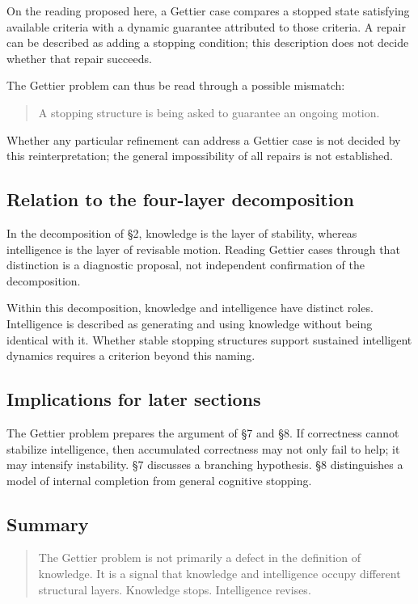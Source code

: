 On the reading proposed here, a Gettier case compares a stopped state satisfying available criteria with a dynamic guarantee attributed to those criteria. A repair can be described as adding a stopping condition; this description does not decide whether that repair succeeds.

The Gettier problem can thus be read through a possible mismatch:

\begin{quote}
A stopping structure is being asked to guarantee an ongoing motion.
\end{quote}

Whether any particular refinement can address a Gettier case is not decided by this reinterpretation; the general impossibility of all repairs is not established.

\subsection{Relation to the four-layer decomposition}

In the decomposition of \S{}2, knowledge is the layer of stability, whereas intelligence is the layer of revisable motion. Reading Gettier cases through that distinction is a diagnostic proposal, not independent confirmation of the decomposition.

Within this decomposition, knowledge and intelligence have distinct roles. Intelligence is described as generating and using knowledge without being identical with it. Whether stable stopping structures support sustained intelligent dynamics requires a criterion beyond this naming.

\subsection{Implications for later sections}

The Gettier problem prepares the argument of \S{}7 and \S{}8. If correctness cannot stabilize intelligence, then accumulated correctness may not only fail to help; it may intensify instability. \S{}7 discusses a branching hypothesis. \S{}8 distinguishes a model of internal completion from general cognitive stopping.

\subsection{Summary}

\begin{quote}
The Gettier problem is not primarily a defect in the definition of knowledge. It is a signal that knowledge and intelligence occupy different structural layers. Knowledge stops. Intelligence revises.
\end{quote}
